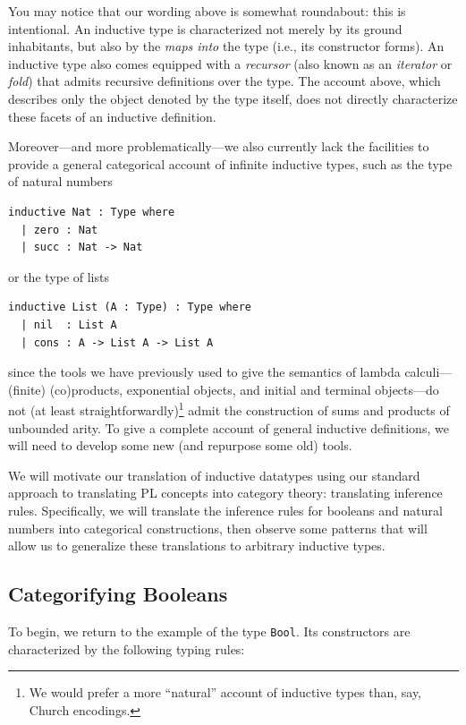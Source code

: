 You may notice that our wording above is somewhat roundabout: this is intentional. An inductive type
is characterized not merely by its ground inhabitants, but also by the \emph{maps into} the type
(i.e., its constructor forms). An inductive type also comes equipped with a \emph{recursor} (also
known as an \emph{iterator} or \emph{fold}) that admits recursive definitions over the type. The
account above, which describes only the object denoted by the type itself, does not directly
characterize these facets of an inductive definition.

Moreover---and more problematically---we also currently lack the facilities to provide a general
categorical account of infinite inductive types, such as the type of natural numbers
\begin{lstlisting}
inductive Nat : Type where
  | zero : Nat
  | succ : Nat -> Nat\end{lstlisting}
or the type of lists
\begin{lstlisting}
inductive List (A : Type) : Type where
  | nil  : List A
  | cons : A -> List A -> List A
\end{lstlisting}
since the tools we have previously used to give the semantics of lambda calculi---(finite)
(co)products, exponential objects, and initial and terminal objects---do not (at least
straightforwardly)\footnote{We would prefer a more ``natural'' account of inductive types than, say,
Church encodings.} admit the construction of sums and products of unbounded arity. To give a
complete account of general inductive definitions, we will need to develop some new (and repurpose
some old) tools.

We will motivate our translation of inductive datatypes using our standard approach to translating
PL concepts into category theory: translating inference rules. Specifically, we will translate the
inference rules for booleans and natural numbers into categorical constructions, then observe some
patterns that will allow us to generalize these translations to arbitrary inductive types.

\subsection{Categorifying Booleans}

To begin, we return to the example of the type \texttt{Bool}. Its constructors are characterized by
the following typing rules:

\begin{mathpar}

\end{mathpar}

